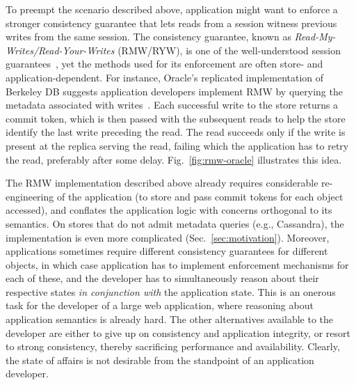 To preempt the scenario described above, application might want to
enforce a stronger consistency guarantee that lets reads from a
session witness previous writes from the same session. The consistency
guarantee, known as \emph{Read-My-Writes/Read-Your-Writes} (RMW/RYW),
is one of the well-understood session guarantees~\cite{terry-pdis94},
yet the methods used for its enforcement are often store- and
application-dependent. For instance, Oracle's replicated
implementation of Berkeley DB suggests application developers implement
RMW by querying the metadata associated with writes~\cite{oracle-ryw}.
Each successful write to the store returns a commit token, which is
then passed with the subsequent reads to help the store identify the
last write preceding the read. The read succeeds only if the write is
present at the replica serving the read, failing which the application
has to retry the read, preferably after some delay.
Fig.~\ref{fig:rmw-oracle} illustrates this idea.

The RMW implementation described above already requires considerable
re-engineering of the application (to store and pass commit tokens for
each object accessed), and conflates the application logic with
concerns orthogonal to its semantics. On stores that do not admit
metadata queries (e.g., Cassandra), the implementation is even more
complicated (Sec.~\ref{sec:motivation}). Moreover, applications
sometimes require different consistency guarantees for different
objects, in which case application has to implement enforcement
mechanisms for each of these, and the developer has to simultaneously
reason about their respective states \emph{in conjunction with} the
application state. This is an onerous task for the developer of a
large web application, where reasoning about application semantics is
already hard. The other alternatives available to the developer are
either to give up on consistency and application integrity, or resort
to strong consistency, thereby sacrificing performance and
availability. Clearly, the state of affairs is not desirable from the
standpoint of an application developer.

